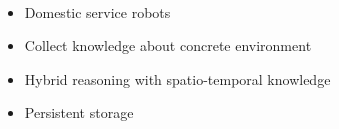 \begin{frame}
\begin{columns}
\begin{column}{0.5\textwidth}
\begin{description}[]
  \item[RoboCup@Home] \hfill \\
    \begin{itemize}
    \item Domestic service robots
    \item Collect knowledge about concrete environment
    \item Hybrid reasoning with spatio-temporal knowledge
    \item Persistent storage
    \end{itemize}
  \end{description}    
    \end{column}
  \end{columns}
  \end{frame}

